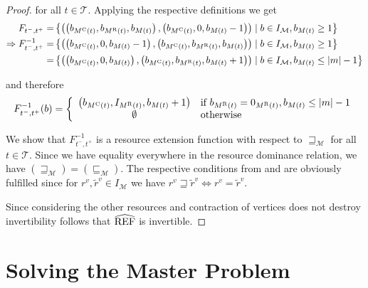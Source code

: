 \begin{proof}
for all $t\in\mathcal{T}$. Applying the respective definitions we get
\begin{align*}
	F_{t^-,t^+} = & \left\{\left(\left( b_{M^{\operatorname{C}}(t)}, b_{M^{\operatorname{R}}(t)}, b_{M(t)} \right), \left( b_{M^{\operatorname{C}}(t)}, 0, b_{M(t)}-1 \right)\right)\mid b\in I_{\mathcal{M}}, b_{M(t)}\geq 1\right\} \\
	\Rightarrow F^{-1}_{t^-,t^+} = & \left\{\left(\left( b_{M^{\operatorname{C}}(t)}, 0, b_{M(t)}-1 \right), \left( b_{M^{\operatorname{C}}(t)}, b_{M^{\operatorname{R}}(t)}, b_{M(t)}\right)\right)\mid b\in I_{\mathcal{M}}, b_{M(t)}\geq 1\right\} \\
	= & \left\{\left(\left( b_{M^{\operatorname{C}}(t)}, 0, b_{M(t)} \right), \left( b_{M^{\operatorname{C}}(t)}, b_{M^{\operatorname{R}}(t)}, b_{M(t)}+1\right)\right)\mid b\in I_{\mathcal{M}}, b_{M(t)}\leq \vert m\vert - 1\right\}
\end{align*}

and therefore
\begin{align*}
	F^{-1}_{t^-,t^+}(b) = \left\{\begin{array}{cl}
		\left(b_{M^{\operatorname{C}}(t)}, I_{M^{\operatorname{R}}(t)}, b_{M(t)}+1\right) & \text{if } b_{M^{\operatorname{R}}(t)} = 0_{M^{\operatorname{R}}(t)}, b_{M(t)}\leq\vert m\vert - 1 \\
		\emptyset & \text{otherwise}
	\end{array}\right.
\end{align*}

We show that $F^{-1}_{t^-,t^+}$ is a resource extension function with respect to $\sqsupseteq_{\mathcal{M}}$ for all $t\in\mathcal{T}$. Since we have equality everywhere in the resource dominance relation, we have ${\left(\sqsupseteq_{\mathcal{M}}\right) = \left(\sqsubseteq_{\mathcal{M}}\right)}$. The respective conditions from  and  are obviously fulfilled since for ${r^v,\tilde{r}^v\in I_{\mathcal{M}}}$ we have ${r^v\sqsupseteq\tilde{r}^v\Leftrightarrow r^v = \tilde{r}^v}$.

Since considering the other resources and contraction of vertices does not destroy invertibility follows that $\widehat{\operatorname{REF}}$ is invertible.

\end{proof}


\section{Solving the Master Problem}
\label{sec:solving_masterproblem}

